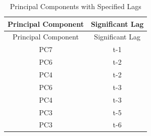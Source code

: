 \documentclass[12pt,oneside]{chicagocapstone}
\begin{document}
\begin{longtable}[]{@{}cc@{}}
\caption{\label{tab:inher} Principal Components with Specified Lags}\tabularnewline
\toprule
\begin{minipage}[b]{0.34\columnwidth}\centering
Principal Component\strut
\end{minipage} & \begin{minipage}[b]{0.44\columnwidth}\centering
Significant Lag\strut
\end{minipage}\tabularnewline
\midrule
\endfirsthead
\toprule
\begin{minipage}[b]{0.34\columnwidth}\centering
Principal Component\strut
\end{minipage} & \begin{minipage}[b]{0.44\columnwidth}\centering
Significant Lag\strut
\end{minipage}\tabularnewline
\midrule
\endhead
\begin{minipage}[t]{0.34\columnwidth}\centering
PC7\strut
\end{minipage} & \begin{minipage}[t]{0.44\columnwidth}\centering
t-1\strut
\end{minipage}\tabularnewline
\begin{minipage}[t]{0.34\columnwidth}\centering
PC6\strut
\end{minipage} & \begin{minipage}[t]{0.44\columnwidth}\centering
t-2\strut
\end{minipage}\tabularnewline
\begin{minipage}[t]{0.34\columnwidth}\centering
PC4\strut
\end{minipage} & \begin{minipage}[t]{0.44\columnwidth}\centering
t-2\strut
\end{minipage}\tabularnewline
\begin{minipage}[t]{0.34\columnwidth}\centering
PC6\strut
\end{minipage} & \begin{minipage}[t]{0.44\columnwidth}\centering
t-3\strut
\end{minipage}\tabularnewline
\begin{minipage}[t]{0.34\columnwidth}\centering
PC4\strut
\end{minipage} & \begin{minipage}[t]{0.44\columnwidth}\centering
t-3\strut
\end{minipage}\tabularnewline
\begin{minipage}[t]{0.34\columnwidth}\centering
PC3\strut
\end{minipage} & \begin{minipage}[t]{0.44\columnwidth}\centering
t-5\strut
\end{minipage}\tabularnewline
\begin{minipage}[t]{0.34\columnwidth}\centering
PC3\strut
\end{minipage} & \begin{minipage}[t]{0.44\columnwidth}\centering
t-6\strut
\end{minipage}\tabularnewline
\bottomrule
\end{longtable}
\end{document}

